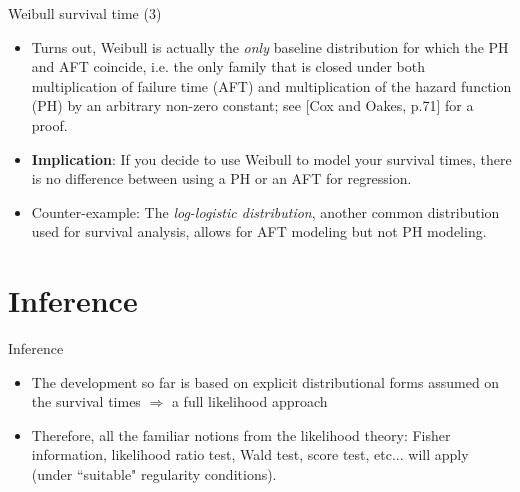 \documentclass{beamer}
\newcommand{\currentsection}{}
\let\oldsection\section
\renewcommand{\section}[1]{\oldsection{#1}\renewcommand{\currentsection}{#1}}
\newcounter{example}
\newenvironment{wideitemize}%
  {\begin{itemize}%
    \setlength{\parskip}{1em}}%
  {\end{itemize}}
\begin{document}
\begin{frame} {Weibull survival time (3)}
\begin{wideitemize}

\item Turns out, Weibull is actually the \emph{only} baseline distribution for which the PH and AFT coincide, i.e. the only family that is closed under both multiplication of failure time (AFT) and multiplication of the hazard function (PH) by an arbitrary non-zero constant; see [Cox and Oakes, p.71] for a proof.

\item {\bf Implication}: If you decide to use Weibull to model your survival times, there is no difference between using a PH or an AFT for regression.

\item Counter-example: The \emph{log-logistic distribution}, another common distribution used for survival analysis, allows for AFT modeling but not PH modeling.

\end{wideitemize}

\end{frame}


\section{Inference}
\begin{frame} {Inference }

\begin{wideitemize}

\item The development so far is based on  explicit distributional forms assumed on the survival times $\Rightarrow$ a full likelihood approach


\item Therefore, all the familiar notions from the likelihood theory: Fisher information, likelihood ratio test, Wald test, score test, etc... will apply (under ``suitable" regularity conditions).



\end{wideitemize}


\end{frame}
\end{document}
